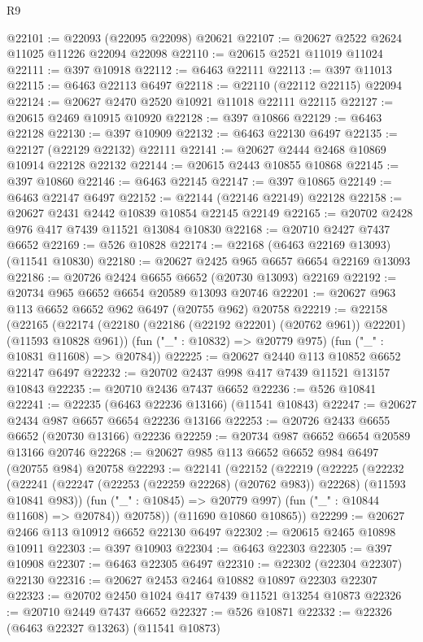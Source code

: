 \begin{lexlean}{R9}
\begin{coremodule}
@22101 := @22093 (@22095 @22098) @20621
@22107 := @20627 @2522 @2624 @11025 @11226 @22094 @22098
@22110 := @20615 @2521 @11019 @11024
@22111 := @397 @10918
@22112 := @6463 @22111
@22113 := @397 @11013
@22115 := @6463 @22113 @6497
@22118 := @22110 (@22112 @22115) @22094
@22124 := @20627 @2470 @2520 @10921 @11018 @22111 @22115
@22127 := @20615 @2469 @10915 @10920
@22128 := @397 @10866
@22129 := @6463 @22128
@22130 := @397 @10909
@22132 := @6463 @22130 @6497
@22135 := @22127 (@22129 @22132) @22111
@22141 := @20627 @2444 @2468 @10869 @10914 @22128 @22132
@22144 := @20615 @2443 @10855 @10868
@22145 := @397 @10860
@22146 := @6463 @22145
@22147 := @397 @10865
@22149 := @6463 @22147 @6497
@22152 := @22144 (@22146 @22149) @22128
@22158 := @20627 @2431 @2442 @10839 @10854 @22145 @22149
@22165 := @20702 @2428 @976 @417 @7439 @11521 @13084 @10830
@22168 := @20710 @2427 @7437 @6652
@22169 := @526 @10828
@22174 := @22168 (@6463 @22169 @13093) (@11541 @10830)
@22180 := @20627 @2425 @965 @6657 @6654 @22169 @13093
@22186 := @20726 @2424 @6655 @6652 (@20730 @13093) @22169
@22192 := @20734 @965 @6652 @6654 @20589 @13093 @20746
@22201 := @20627 @963 @113 @6652 @6652 @962 @6497 (@20755 @962) @20758
@22219 := @22158
    (@22165
      (@22174 (@22180 (@22186 (@22192 @22201) (@20762 @961)) @22201) (@11593 @10828 @961))
      (fun ("_" : @10832) => @20779 @975)
      (fun ("_" : @10831 @11608) => @20784))
@22225 := @20627 @2440 @113 @10852 @6652 @22147 @6497
@22232 := @20702 @2437 @998 @417 @7439 @11521 @13157 @10843
@22235 := @20710 @2436 @7437 @6652
@22236 := @526 @10841
@22241 := @22235 (@6463 @22236 @13166) (@11541 @10843)
@22247 := @20627 @2434 @987 @6657 @6654 @22236 @13166
@22253 := @20726 @2433 @6655 @6652 (@20730 @13166) @22236
@22259 := @20734 @987 @6652 @6654 @20589 @13166 @20746
@22268 := @20627 @985 @113 @6652 @6652 @984 @6497 (@20755 @984) @20758
@22293 := @22141
    (@22152
      (@22219
        (@22225
          (@22232
            (@22241 (@22247 (@22253 (@22259 @22268) (@20762 @983)) @22268) (@11593 @10841 @983))
            (fun ("_" : @10845) => @20779 @997)
            (fun ("_" : @10844 @11608) => @20784))
          @20758))
      (@11690 @10860 @10865))
@22299 := @20627 @2466 @113 @10912 @6652 @22130 @6497
@22302 := @20615 @2465 @10898 @10911
@22303 := @397 @10903
@22304 := @6463 @22303
@22305 := @397 @10908
@22307 := @6463 @22305 @6497
@22310 := @22302 (@22304 @22307) @22130
@22316 := @20627 @2453 @2464 @10882 @10897 @22303 @22307
@22323 := @20702 @2450 @1024 @417 @7439 @11521 @13254 @10873
@22326 := @20710 @2449 @7437 @6652
@22327 := @526 @10871
@22332 := @22326 (@6463 @22327 @13263) (@11541 @10873)

\end{coremodule}
\end{lexlean}
